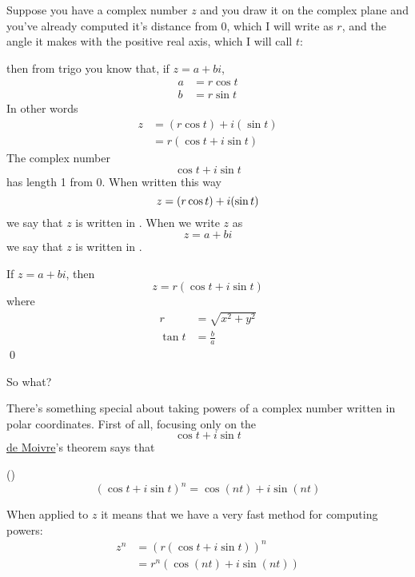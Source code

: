 Suppose you have a complex number $z$ and you draw it on the 
complex plane and you've already computed it's distance
from 0, which I will write as $r$, and the angle
it makes with the positive real axis, which I will call $t$:

then from trigo you know that, if $z = a + bi$,
\begin{align*}
a &= r \cos t \\
b &= r \sin t 
\end{align*}
In other words
\begin{align*}
z 
&= (r \cos t) + i (\sin t) \\
&= r(\cos t + i \sin t) 
\end{align*}
The complex number 
\[
\cos t + i \sin t
\]
has length 1 from 0.
When written this way
\[
z = (r \cos t) + i (\sin t) \\
\]
we say that $z$ is written in
.
When we write $z$ as
\[
z = a + bi
\]
we say that $z$ is written in .
\begin{prop}
  If $z = a + bi$, then
  \[
  z = r(\cos t + i \sin t)
  \]
  where
  \begin{align*}
    r &= \sqrt{x^2 + y^2} \\
    \tan t &= \frac{b}{a}
  \end{align*}
  \qed
\end{prop}

So what?

There's something special about taking powers of a complex
number written in polar coordinates.
First of all, focusing only on the 
\[
\cos t + i \sin t
\]
\href{https://en.wikipedia.org/wiki/Abraham_de_Moivre}{de Moivre}'s theorem says that

\begin{thm} \textnormal{()}
\[
(\cos t + i \sin t)^n
=
\cos (nt) + i \sin (nt)
\]
\end{thm}

When applied to $z$ it means that we have a very fast method for computing
powers:
\begin{align*}
z^n  
&= (r (\cos t + i \sin t))^n \\
&= r^n (\cos (nt) + i \sin (nt))
\end{align*}




